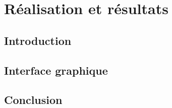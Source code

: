 \chapter{Réalisation et résultats}

\section{Introduction}

\section{Interface graphique}

\section{Conclusion}